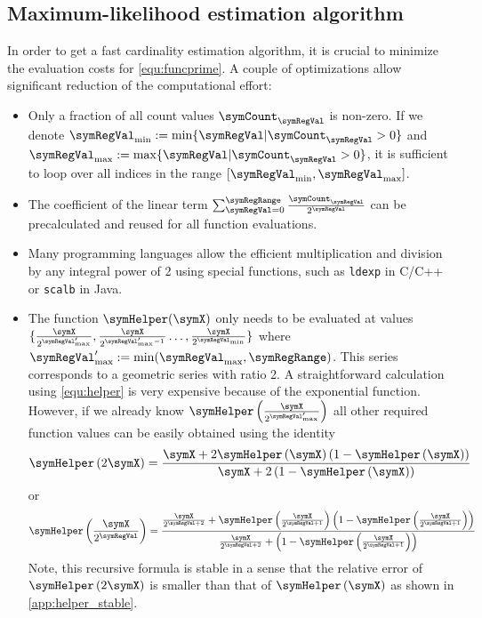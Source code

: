 \documentclass[a4paper]{scrartcl}
\begin{document}
\subsection{Maximum-likelihood estimation algorithm}
In order to get a fast cardinality estimation algorithm, it is crucial to minimize the evaluation costs for \eqref{equ:funcprime}. A couple of optimizations allow significant reduction of the computational effort:
\begin{itemize}
\item Only a fraction of all count values $\symCount_\symRegVal$ is non-zero. If we denote $\symRegVal_\text{min}:=\min\lbrace \symRegVal\vert\symCount_\symRegVal>0\rbrace$ and $\symRegVal_\text{max}:=\max\lbrace \symRegVal\vert\symCount_\symRegVal>0\rbrace$,  it is sufficient to loop over all indices in the range $[\symRegVal_\text{min}, \symRegVal_\text{max}]$.
\item The coefficient of the linear term $\sum_{\symRegVal=0}^\symRegRange \frac{\symCount_\symRegVal}{2^\symRegVal}$ can be precalculated and reused for all function evaluations.
\item Many programming languages allow the efficient multiplication and division by any integral power of 2 using special functions, such as \texttt{ldexp} in C/C++ or \texttt{scalb} in Java.
\item The function $\symHelper(\symX)$ only needs to be evaluated at values $\lbrace\frac{\symX}{2^{\symRegVal'_\text{max}}},\frac{\symX}{2^{\symRegVal'_\text{max}-1}}\ldots,\frac{\symX}{2^{\symRegVal_\text{min}}}\rbrace$ where $\symRegVal'_\text{max} := \min(\symRegVal_\text{max}, \symRegRange)$. This series corresponds to a geometric series with ratio 2. A straightforward calculation using \eqref{equ:helper} is very expensive because of the exponential function. However, if we already know $\symHelper\left(\frac{\symX}{2^{\symRegVal'_\text{max}}}\right)$ all other required function values can be easily obtained using the identity
\begin{equation}
\label{equ:helper_recursion1}
\symHelper\left(2\symX\right) = \frac{\symX+2\symHelper\left(\symX\right)\left(1-\symHelper\left(\symX\right)\right)}{\symX+2\left(1-\symHelper\left(\symX\right)\right)}
\end{equation}
or
\begin{equation}
\label{equ:helper_recursion2}
\symHelper\left(\frac{\symX}{2^{\symRegVal}}\right) = \frac{\frac{\symX}{2^{\symRegVal+2}}+\symHelper\left(\frac{\symX}{2^{\symRegVal+1}}\right)\left(1-\symHelper\left(\frac{\symX}{2^{\symRegVal+1}}\right)\right)}{\frac{\symX}{2^{\symRegVal+2}}+\left(1-\symHelper\left(\frac{\symX}{2^{\symRegVal+1}}\right)\right)}
\end{equation}
Note, this recursive formula is stable in a sense that the relative error of $\symHelper\left(2\symX\right)$ is smaller than that of $\symHelper\left(\symX\right)$ as shown in \cref{app:helper_stable}.


\end{itemize}
\end{document}
